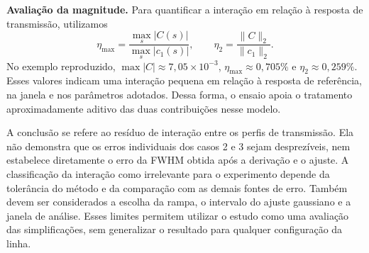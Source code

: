 \documentclass[12pt,a4paper]{article}
\begin{document}
\noindent\textbf{Avaliação da magnitude.} Para quantificar a interação em relação à resposta de transmissão, utilizamos
\begin{equation}
    \eta_{\max}=\frac{\max_s|C(s)|}{\max_s|c_1(s)|},
    \qquad
    \eta_2=\frac{\|C\|_2}{\|c_1\|_2}.
    \label{eq:metricas-interacao-aproximacoes}
\end{equation}
No exemplo reproduzido, $\max|C|\approx7{,}05\times10^{-3}$, $\eta_{\max}\approx0{,}705\%$ e $\eta_2\approx0{,}259\%$. Esses valores indicam uma interação pequena em relação à resposta de referência, na janela e nos parâmetros adotados. Dessa forma, o ensaio apoia o tratamento aproximadamente aditivo das duas contribuições nesse modelo.

A conclusão se refere ao resíduo de interação entre os perfis de transmissão. Ela não demonstra que os erros individuais dos casos 2 e 3 sejam desprezíveis, nem estabelece diretamente o erro da FWHM obtida após a derivação e o ajuste. A classificação da interação como irrelevante para o experimento depende da tolerância do método e da comparação com as demais fontes de erro. Também devem ser considerados a escolha da rampa, o intervalo do ajuste gaussiano e a janela de análise. Esses limites permitem utilizar o estudo como uma avaliação das simplificações, sem generalizar o resultado para qualquer configuração da linha.
\end{document}
